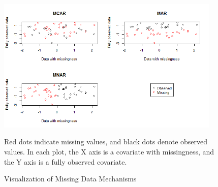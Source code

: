 \begin{figure}[h!]
  \centering
    \includegraphics[width=0.95\textwidth]{md_mechanism}
  \caption{Visualization of Missing Data Mechanisms}
\medskip
Red dots indicate missing values, and black dots denote observed values. In each plot, the X axis is a covariate with missingness, and the Y axis is a fully observed covariate.
\label{fig:miviz}
\end{figure}


